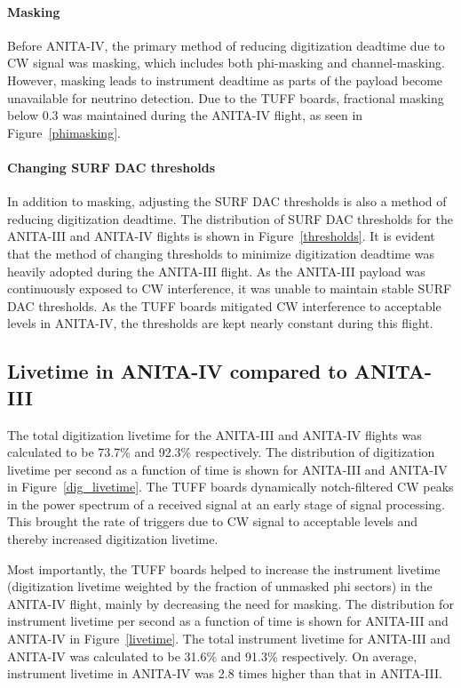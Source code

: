 \documentclass[preprint,12pt]{elsarticle}
\begin{document}
\paragraph{Masking} 
Before ANITA-IV, the primary method of reducing digitization 
deadtime due to CW signal was masking, which includes both phi-masking and channel-masking.
However, masking leads to instrument deadtime as parts of the payload 
become unavailable for neutrino detection. 
Due to the TUFF boards, fractional masking below $0.3$ was maintained during the ANITA-IV flight,
as seen in Figure~\ref{phimasking}. 

\paragraph{Changing SURF DAC thresholds} In addition to masking, adjusting the SURF DAC thresholds is also a method of reducing digitization deadtime.
The distribution of SURF DAC thresholds for the ANITA-III and ANITA-IV flights is shown in Figure~\ref{thresholds}. 
It is evident that the method of changing thresholds to minimize digitization deadtime 
was heavily 
adopted during the ANITA-III flight.
As the ANITA-III payload was continuously exposed to CW interference, it was unable to maintain stable SURF DAC thresholds. 
As the TUFF boards mitigated CW interference to acceptable levels in ANITA-IV, the thresholds are kept nearly constant during this flight. 

\subsection{Livetime in ANITA-IV compared to ANITA-III} 

The total digitization livetime for the ANITA-III and ANITA-IV flights was calculated to be 73.7\% and 92.3\% respectively. 
The distribution of digitization livetime per second as a function of time is shown for ANITA-III and ANITA-IV in Figure~\ref{dig_livetime}. 
The TUFF boards dynamically notch-filtered CW peaks in the power spectrum 
of a received signal at an early stage of signal processing.
This 
brought the rate of triggers due to CW signal to acceptable levels and thereby 
increased digitization livetime. 

Most importantly, the TUFF boards helped to increase the instrument livetime (digitization livetime weighted by the fraction of
unmasked phi sectors) in the ANITA-IV flight, mainly by decreasing the need for masking. 
The distribution for instrument livetime per second as a function of time is shown for ANITA-III and ANITA-IV in Figure~\ref{livetime}. 
The total instrument livetime for ANITA-III and ANITA-IV was calculated to be 31.6\% and 91.3\% respectively. 
On average, instrument livetime in ANITA-IV was 2.8 times higher than that in ANITA-III. 
\end{document}
